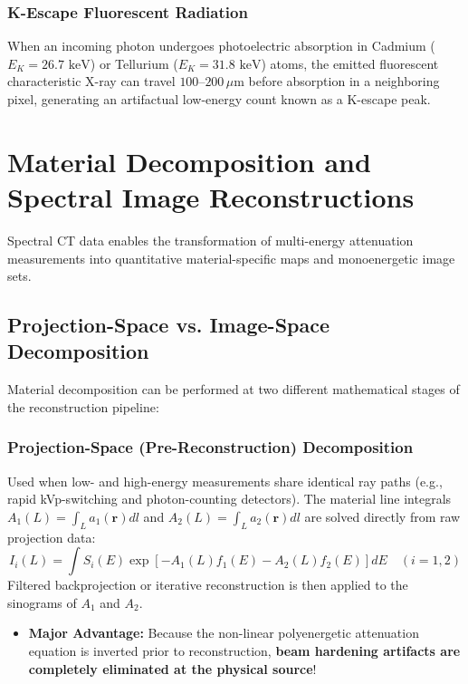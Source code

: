 \documentclass[11pt,a4paper]{article}
\begin{document}
\subsubsection{K-Escape Fluorescent Radiation}
When an incoming photon undergoes photoelectric absorption in Cadmium ($E_K = 26.7\text{ keV}$) or Tellurium ($E_K = 31.8\text{ keV}$) atoms, the emitted fluorescent characteristic X-ray can travel $100\text{--}200\,\mu\text{m}$ before absorption in a neighboring pixel, generating an artifactual low-energy count known as a K-escape peak.

\section{Material Decomposition and Spectral Image Reconstructions}

Spectral CT data enables the transformation of multi-energy attenuation measurements into quantitative material-specific maps and monoenergetic image sets.

\subsection{Projection-Space vs. Image-Space Decomposition}
Material decomposition can be performed at two different mathematical stages of the reconstruction pipeline:

\subsubsection{Projection-Space (Pre-Reconstruction) Decomposition}
Used when low- and high-energy measurements share identical ray paths (e.g., rapid kVp-switching and photon-counting detectors). The material line integrals $A_1(L) = \int_L a_1(\mathbf{r}) dl$ and $A_2(L) = \int_L a_2(\mathbf{r}) dl$ are solved directly from raw projection data:
\begin{equation}
    I_i(L) = \int S_i(E) \exp\left[ -A_1(L) f_1(E) - A_2(L) f_2(E) \right] dE \quad (i = 1, 2)
\end{equation}
Filtered backprojection or iterative reconstruction is then applied to the sinograms of $A_1$ and $A_2$.
\begin{itemize}
    \item \textbf{Major Advantage:} Because the non-linear polyenergetic attenuation equation is inverted prior to reconstruction, \textbf{beam hardening artifacts are completely eliminated at the physical source}!
\end{itemize}
\end{document}
